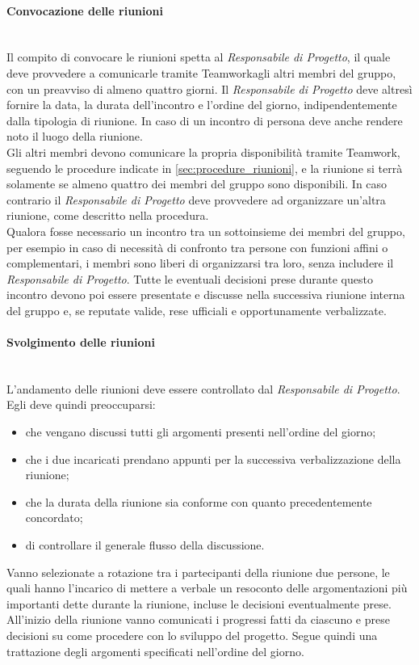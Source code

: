 \paragraph{Convocazione delle riunioni}\mbox{}\\
Il compito di convocare le riunioni spetta al \textit{Responsabile di Progetto}, il quale deve provvedere a comunicarle tramite Teamwork\texttrademark\space agli altri membri del gruppo, con un preavviso di almeno quattro giorni. Il \textit{Responsabile di Progetto} deve altresì fornire la data, la durata dell'incontro e l'ordine del giorno, indipendentemente dalla tipologia di riunione. In caso di un incontro di persona deve anche rendere noto il luogo della riunione.\\
Gli altri membri devono comunicare la propria disponibilità tramite Teamwork\texttrademark, seguendo le procedure indicate in \sezione \ref{sec:procedure_riunioni}, e la riunione si terrà solamente se almeno quattro dei membri del gruppo sono disponibili. In caso contrario il \textit{Responsabile di Progetto} deve provvedere ad organizzare un'altra riunione, come descritto nella procedura.\\
Qualora fosse necessario un incontro tra un sottoinsieme dei membri del gruppo, per esempio in caso di necessità di confronto tra persone con funzioni affini o complementari, i membri sono liberi di organizzarsi tra loro, senza includere il \textit{Responsabile di Progetto}. Tutte le eventuali decisioni prese durante questo incontro devono poi essere presentate e discusse nella successiva riunione interna del gruppo e, se reputate valide, rese ufficiali e opportunamente verbalizzate.

\paragraph{Svolgimento delle riunioni}\label{sec:svolgimento_riunioni_interne} \mbox{}\\
L'andamento delle riunioni deve essere controllato dal \textit{Responsabile di Progetto}. Egli deve quindi preoccuparsi:

\begin{itemize}
	\item che vengano discussi tutti gli argomenti presenti nell'ordine del giorno;
	\item che i due incaricati prendano appunti per la successiva verbalizzazione della riunione;
	\item che la durata della riunione sia conforme con quanto precedentemente concordato;
	\item di controllare il generale flusso della discussione.
\end{itemize}
Vanno selezionate a rotazione tra i partecipanti della riunione due persone, le quali hanno l'incarico di mettere a verbale un resoconto delle argomentazioni più importanti dette durante la riunione, incluse le decisioni eventualmente prese. All'inizio della riunione vanno comunicati i progressi fatti da ciascuno e prese decisioni su come procedere con lo sviluppo del progetto. Segue quindi una trattazione degli argomenti specificati nell'ordine del giorno. 

